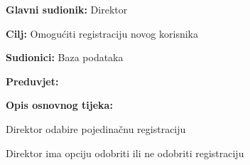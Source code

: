 				\noindent {}
				\begin{packed_item}
					
					\item \textbf{Glavni sudionik:} Direktor
					\item  \textbf{Cilj:} Omogućiti registraciju novog korisnika
					\item  \textbf{Sudionici:} Baza podataka
					\item  \textbf{Preduvjet:} 
					\item  \textbf{Opis osnovnog tijeka:}
					
					\item[] \begin{packed_enum}
						
						\item Direktor odabire pojedinačnu registraciju
						\item Direktor ima opciju odobriti ili ne odobriti registraciju
                    
					\end{packed_enum}
					
				\end{packed_item}
					